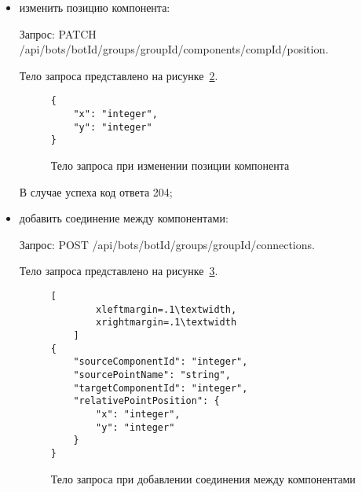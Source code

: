 \begin{itemize}
	      Тело запроса представлено на рисунке~\ref{f:update-component-data}.


	      \begin{figure}[ht]
		      \centering
		      \vspace{\toppaddingoffigure}
		      \begin{lstlisting}
{
    "<property name>": "any",
    ...
}
    \end{lstlisting}
		      \caption{Тело запроса при изменении данных компонента}
		      \label{f:update-component-data}
	      \end{figure}

	      В случае успеха код ответа 204;

	\item изменить позицию компонента:

	      Запрос: PATCH /api/bots/{botId}/groups/{groupId}/components/{compId}/position.

	      Тело запроса представлено на рисунке~\ref{f:update-component-position}.


	      \begin{figure}[ht]
		      \centering
		      \vspace{\toppaddingoffigure}
		      \begin{lstlisting}
{
    "x": "integer",
    "y": "integer"
}
    \end{lstlisting}
		      \caption{Тело запроса при изменении позиции компонента}
		      \label{f:update-component-position}
	      \end{figure}

	      В случае успеха код ответа 204;

	\item добавить соединение между компонентами:

	      Запрос: POST /api/bots/{botId}/groups/{groupId}/connections.

	      Тело запроса представлено на рисунке~\ref{f:add-connection}.

	      \begin{figure}[ht]
		      \centering
		      \vspace{\toppaddingoffigure}
		      \begin{lstlisting}[
        xleftmargin=.1\textwidth,
        xrightmargin=.1\textwidth
    ]
{
    "sourceComponentId": "integer",
    "sourcePointName": "string",
    "targetComponentId": "integer",
    "relativePointPosition": {
        "x": "integer",
        "y": "integer"
    }
}
    \end{lstlisting}
		      \caption{Тело запроса при добавлении соединения между компонентами}
		      \label{f:add-connection}
	      \end{figure}


\end{itemize}
